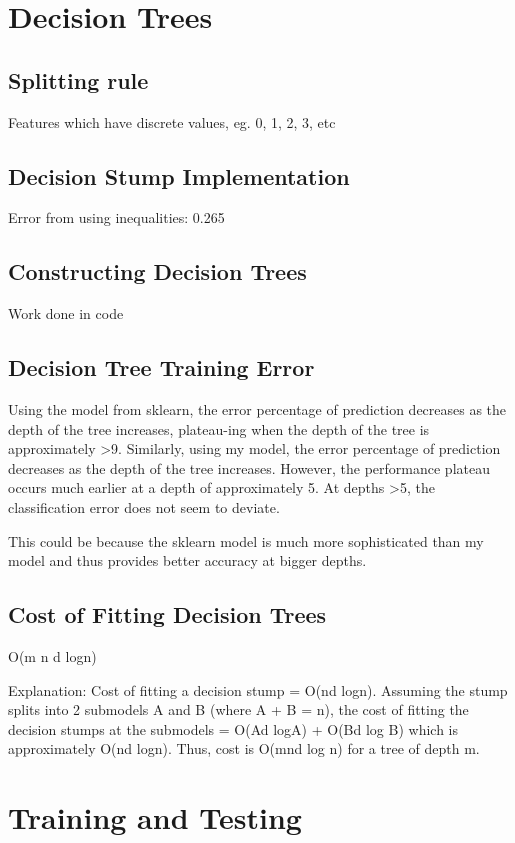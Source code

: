 \documentclass{article}
\begin{document}
\section{Decision Trees}

\subsection{Splitting rule}
Features which have discrete values, eg. 0, 1, 2, 3, etc


\subsection{Decision Stump Implementation}
Error from using inequalities: 0.265


\subsection{Constructing Decision Trees}

Work done in code

\subsection{Decision Tree Training Error}

Using the model from sklearn, the error percentage of prediction decreases as the depth of the tree increases, plateau-ing when the depth of the tree is approximately >9. Similarly, using my model, the error percentage of prediction decreases as the depth of the tree increases. However, the performance plateau occurs much earlier at a depth of approximately 5. At depths >5, the classification error does not seem to deviate.

This could be because the sklearn model is much more sophisticated than my model and thus provides better accuracy at bigger depths.


\subsection{Cost of Fitting Decision Trees}
O(m n d logn)

Explanation:
Cost of fitting a decision stump = O(nd logn). Assuming the stump splits into 2 submodels A and B (where A + B = n), the cost of fitting the decision stumps at the submodels = O(Ad logA) + O(Bd log B) which is approximately O(nd logn). Thus, cost is O(mnd log n) for a tree of depth m.


\section{Training and Testing}
\end{document}

